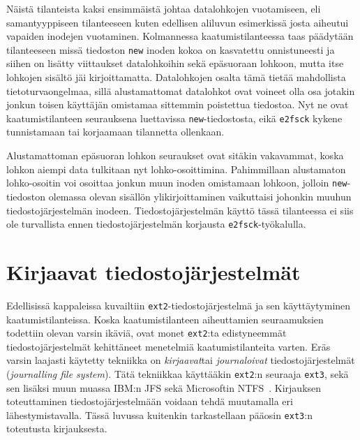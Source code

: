 Näistä tilanteista kaksi ensimmäistä johtaa datalohkojen vuotamiseen,
eli samantyyppiseen tilanteeseen kuten edellisen aliluvun esimerkissä josta aiheutui vapaiden inodejen vuotaminen.
Kolmannessa kaatumistilanteessa taas päädytään tilanteeseen missä tiedoston \texttt{new} inoden kokoa on kasvatettu onnistuneesti ja siihen on lisätty viittaukset datalohkoihin sekä epäsuoraan lohkoon,
mutta itse lohkojen sisältö jäi kirjoittamatta.
Datalohkojen osalta tämä tietää mahdollista tietoturvaongelmaa,
sillä alustamattomat datalohkot ovat voineet olla osa jotakin jonkun toisen käyttäjän omistamaa sittemmin poistettua tiedostoa.
Nyt ne ovat kaatumistilanteen seurauksena luettavissa \texttt{new}-tiedostosta,
eikä \texttt{e2fsck} kykene tunnistamaan tai korjaamaan tilannetta ollenkaan.

Alustamattoman epäsuoran lohkon seuraukset ovat sitäkin vakavammat,
koska lohkon aiempi data tulkitaan nyt lohko-osoittimina.
Pahimmillaan alustamaton lohko-osoitin voi osoittaa jonkun muun inoden omistamaan lohkoon,
jolloin \texttt{new}-tiedoston olemassa olevan sisällön ylikirjoittaminen vaikuttaisi johonkin muuhun tiedostojärjestelmän inodeen.
Tiedostojärjestelmän käyttö tässä tilanteessa ei siis ole turvallista ennen tiedostojärjestelmän korjausta \texttt{e2fsck}-työkalulla.


\section{Kirjaavat tiedostojärjestelmät}
\label{ChapJournallingFs}
Edellisissä kappaleissa kuvailtiin \texttt{ext2}-tiedostojärjestelmä ja sen käyttäytyminen kaatumistilanteissa.
Koska kaatumistilanteen aiheuttamien seuraamuksien todettiin olevan varsin ikäviä,
ovat monet \texttt{ext2}:ta edistyneemmät tiedostojärjestelmät kehittäneet menetelmiä kaatumistilanteita varten.
Eräs varsin laajasti käytetty tekniikka on \emph{kirjaavat}tai \emph{journaloivat} tiedostojärjestelmät (\emph{journalling file system}).
Tätä tekniikkaa käyttääkin \texttt{ext2}:n seuraaja \texttt{ext3}, sekä sen lisäksi
muun muassa IBM:n JFS sekä Microsoftin NTFS~\cite{JournalingAnalysis}.
Kirjauksen toteuttaminen tiedostojärjestelmään voidaan tehdä muutamalla eri lähestymistavalla.
Tässä luvussa kuitenkin tarkastellaan pääosin \texttt{ext3}:n toteutusta kirjauksesta.

